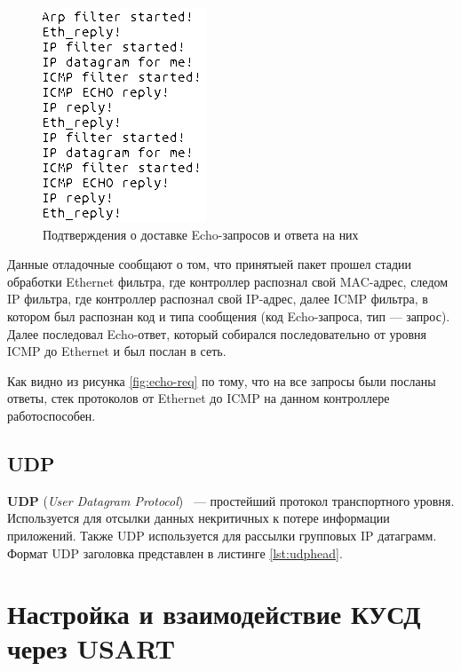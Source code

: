 \begin{figure}[h!]
	\centering
		\includegraphics[scale=0.7]{img/echo-reply-log.png}
	\caption{Подтверждения о доставке Echo-запросов и ответа на них\label{fig:echo-reply-log}}
\end{figure}

Данные отладочные сообщают о том, что принятыей пакет прошел стадии обработки Ethernet фильтра, где контроллер распознал свой MAC-адрес, следом IP фильтра, где контроллер распознал свой IP-адрес, далее ICMP фильтра, в котором был распознан код и типа сообщения (код Echo-запроса, тип --- запрос). Далее последовал Echo-ответ, который собирался последовательно от уровня ICMP до Ethernet и был послан в сеть.

Как видно из рисунка \ref{fig:echo-req} по тому, что на все запросы были посланы ответы, стек протоколов от Ethernet до ICMP на данном контроллере работоспособен.

\subsection{UDP}

\textbf{UDP} (\textit{User Datagram Protocol}) ~--- простейший протокол транспортного уровня. Используется для отсылки данных некритичных к потере информации приложений. Также UDP используется для рассылки групповых IP датаграмм. Формат UDP заголовка представлен в листинге \ref{lst:udphead}.

{\small{}}

\section{Настройка и взаимодействие КУСД через USART}

